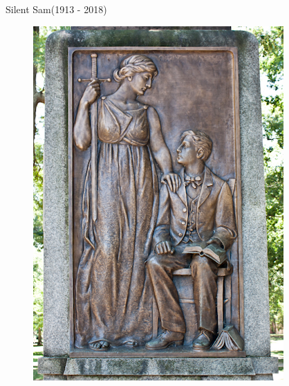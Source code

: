 \documentclass[10pt]{beamer}
\begin{document}
\begin{frame}{Silent Sam(1913 - 2018)}
\begin{minipage}{0.4\textwidth}
\begin{figure}
        \includegraphics[scale = 0.3]{photos/photo4.png}
    \end{figure}
    \end{minipage}
\end{frame}
\end{document}
